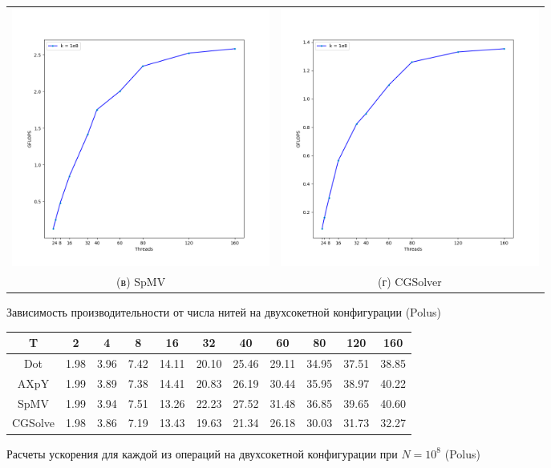 \documentclass[12pt, a4paper]{article}
\begin{document}
\begin{figure}[H]
\begin{tabular}{cc}
		\includegraphics[width=85mm]{multithread_polus_spmv2} & \includegraphics[width=85mm]{multithread_polus_cgsolver2} \\
		(в) SpMV & (г) CGSolver \\[6pt]
	\end{tabular}
	\caption{Зависимость производительности от числа нитей на двухсокетной конфигурации (Polus)}
	\label{fig:multithread_flops_polus2} 
\end{figure}

\begin{figure}[H]
	\center
	\setlength{\tabcolsep}{10pt}
	\renewcommand{\arraystretch}{1.5}
	\begin{tabular}{|c|c|c|c|c|c|c|c|c|c|c|}
		\hline
		T & 2 & 4 & 8 & 16 & 32 & 40 & 60 & 80 & 120 & 160  \\
		\hline
		Dot & 1.98 & 3.96 & 7.42 & 14.11 & 20.10 & 25.46 & 29.11 & 34.95 & 37.51 & 38.85 \\
		\hline
		AXpY & 1.99 & 3.89 & 7.38 & 14.41 & 20.83 & 26.19 & 30.44 & 35.95 & 38.97 & 40.22  \\
		\hline
		SpMV & 1.99 & 3.94 & 7.51 & 13.26 & 22.23 & 27.52 & 31.48 & 36.85 & 39.65 & 40.60  \\
		\hline
		CGSolve & 1.98 & 3.86 & 7.19 & 13.43 & 19.63 & 21.34 & 26.18 & 30.03 & 31.73 & 32.27 \\
		\hline
	\end{tabular}
	\caption{Расчеты ускорения для каждой из операций на двухсокетной конфигурации при $N = 10^8$ (Polus)}
	\label{fig:speedup2}
\end{figure}
\end{document}
